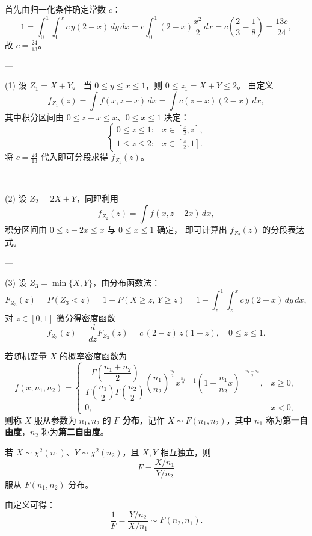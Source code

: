 \begin{solution}
首先由归一化条件确定常数 $c$：
\[
1=\int_0^1\!\!\int_0^x c\,y(2-x)\,dy\,dx
=c\int_0^1 (2-x)\frac{x^2}{2}\,dx
=c\!\left(\frac{2}{3}-\frac{1}{8}\right)=\frac{13c}{24},
\]
故 $c=\frac{24}{13}$。

---

(1) 设 $Z_1=X+Y$。  
当 $0\le y\le x\le1$，则 $0\le z_1=X+Y\le2$。  
由定义
\[
f_{Z_1}(z)=\int f(x,z-x)\,dx
=\int c(z-x)(2-x)\,dx,
\]
其中积分区间由 $0\le z-x\le x$、$0\le x\le1$ 决定：
\[
\begin{cases}
0\le z\le1: & x\in[\tfrac{z}{2},z],\\
1\le z\le2: & x\in[\tfrac{z}{2},1].
\end{cases}
\]
将 $c=\tfrac{24}{13}$ 代入即可分段求得 $f_{Z_1}(z)$。

---

(2) 设 $Z_2=2X+Y$，同理利用
\[
f_{Z_2}(z)=\int f\!\left(x,z-2x\right)\,dx,
\]
积分区间由 $0\le z-2x\le x$ 与 $0\le x\le1$ 确定，
即可计算出 $f_{Z_2}(z)$ 的分段表达式。

---

(3) 设 $Z_3=\min\{X,Y\}$，由分布函数法：
\[
F_{Z_3}(z)=P(Z_3<z)=1-P(X\ge z,\,Y\ge z)
=1-\!\int_z^1\!\!\int_z^x c\,y(2-x)\,dy\,dx,
\]
对 $z\in[0,1]$ 微分得密度函数
\[
f_{Z_3}(z)=\frac{d}{dz}F_{Z_3}(z)
=c\,(2-z)\,z(1-z),
\quad 0\le z\le1.
\]
\end{solution}































\newpage
\begin{definition}[$F$ 分布]
若随机变量 $X$ 的概率密度函数为
\[
f(x;n_1,n_2)=
\begin{cases}
\dfrac{\Gamma\!\left(\dfrac{n_1+n_2}{2}\right)}
{\Gamma\!\left(\dfrac{n_1}{2}\right)\Gamma\!\left(\dfrac{n_2}{2}\right)}
\left(\dfrac{n_1}{n_2}\right)^{\!\frac{n_1}{2}}
x^{\frac{n_1}{2}-1}
\left(1+\dfrac{n_1}{n_2}x\right)^{-\frac{n_1+n_2}{2}}, & x\ge0,\\[10pt]
0, & x<0,
\end{cases}
\]
则称 $X$ 服从参数为 $n_1,n_2$ 的 \textbf{$F$ 分布}，记作 $X\sim F(n_1,n_2)$，其中 $n_1$ 称为\textbf{第一自由度}，$n_2$ 称为\textbf{第二自由度}。

若 $X\sim\chi^2(n_1)$、$Y\sim\chi^2(n_2)$，且 $X,Y$ 相互独立，则
\[
F=\frac{X/n_1}{Y/n_2}
\]
服从 $F(n_1,n_2)$ 分布。

由定义可得：
\[
\frac{1}{F}=\frac{Y/n_2}{X/n_1}\sim F(n_2,n_1).
\]
\end{definition}
